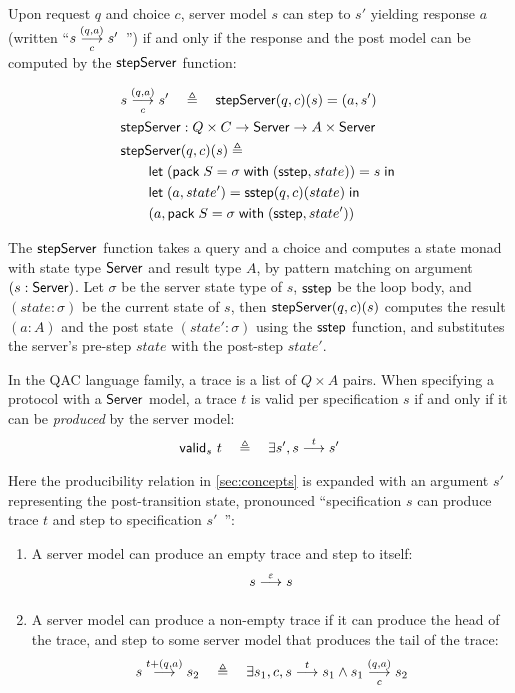 \begin{definition}
  \label{def:server-step}
  Upon request $q$ and choice $c$, server model $s$ can step to $s'$ yielding
  response $a$ (written ``$\triggers sc{(q,a)}s'$~'') if and only if the
  response and the post model can be computed by the $\mathsf{stepServer}$ function:

\begin{align*}
  &\triggers sc{(q,a)}s'\quad\triangleq\quad\stepServer(q,c)(s)=(a,s')\\
  &\stepServer:Q\times C \to \Server \to A\times \Server \\
  &\stepServer(q,c)(s)\triangleq\\
  &\qquad\letin{(\existT{S}{\sigma}{(\sstep, state)})}{s}\\
  &\qquad\letin{(a,state')}{\sstep(q,c)(state)} \\
  &\qquad(a, \existT{S}{\sigma}{(\sstep, state')})
\end{align*}

The $\mathsf{stepServer}$ function takes a query and a choice and computes a state monad
with state type $\mathsf{Server}$ and result type $A$, by pattern matching on argument
$(s:\mathsf{Server})$.  Let $\sigma$ be the server state type of $s$, $\mathsf{sstep}$ be the
loop body, and $(state:\sigma)$ be the current state of $s$, then
$\mathsf{stepServer}(q,c)(s)$ computes the result $(a:A)$ and the post state
$(state':\sigma)$ using the $\mathsf{sstep}$ function, and substitutes the server's
pre-step $state$ with the post-step $state'$.
\end{definition}

\begin{definition}
  \label{def:trace-validity}
  In the QAC language family, a trace is a list of $Q\times A$ pairs.  When
  specifying a protocol with a $\mathsf{Server}$ model, a trace $t$ is valid per
  specification $s$ if and only if it can be {\em produced} by the server model:
  \[\valid s t\quad\triangleq\quad\exists s',\behaves s t s'\]
  Here the producibility relation in \autoref{sec:concepts} is expanded with an
  argument $s'$ representing the post-transition state, pronounced
  ``specification $s$ can produce trace $t$ and step to specification $s'$~'':
  \begin{enumerate}
  \item A server model can produce an empty trace and step to itself:
    \[\behaves s \nil s\]
  \item A server model can produce a non-empty trace if it can produce the head
    of the trace, and step to some server model that produces the tail of the
    trace:
    \[\behaves s {t+(q,a)} s_2\quad\triangleq\quad\exists s_1,c,\behaves s t s_1\wedge\triggers {s_1}c{(q,a)}s_2\]
  \end{enumerate}
\end{definition}

